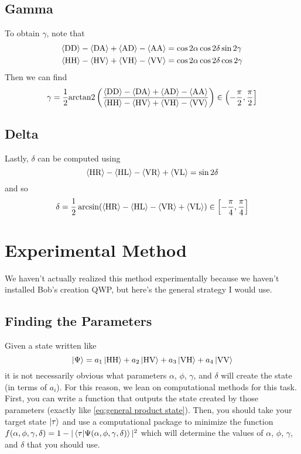 \documentclass{paper}[11pt]
\begin{document}
	
	\subsection{Gamma}
	To obtain $\gamma$, note that
	\begin{align}
		{\langle{\text{DD}}\rangle}-{\langle{\text{DA}}\rangle}+{\langle{\text{AD}}\rangle}-{\langle{\text{AA}}\rangle} &= \cos2\alpha\cos2\delta\sin2\gamma \\
		{\langle{\text{HH}}\rangle}-{\langle{\text{HV}}\rangle}+{\langle{\text{VH}}\rangle}-{\langle{\text{VV}}\rangle} &= \cos2\alpha\cos2\delta\cos2\gamma
	\end{align}
	Then we can find
	\begin{equation}
		\gamma=\frac{1}{2}\text{\rmfamily arctan2\normalfont}\left(\frac{{\langle{\text{DD}}\rangle}-{\langle{\text{DA}}\rangle}+{\langle{\text{AD}}\rangle}-{\langle{\text{AA}}\rangle}}{{\langle{\text{HH}}\rangle}-{\langle{\text{HV}}\rangle}+{\langle{\text{VH}}\rangle}-{\langle{\text{VV}}\rangle}}\right)\in\left(-\frac{\pi}{2}, \frac{\pi}{2}\right]\label{eq:experimental gamma}
	\end{equation}
	
	\subsection{Delta}
	Lastly, $\delta$ can be computed using
	\begin{equation}
		{\langle{\text{HR}}\rangle}-{\langle{\text{HL}}\rangle}-{\langle{\text{VR}}\rangle}+{\langle{\text{VL}}\rangle} = \sin2\delta
	\end{equation}
	and so
	\begin{equation}
		\delta = \frac{1}{2}\arcsin({\langle{\text{HR}}\rangle}-{\langle{\text{HL}}\rangle}-{\langle{\text{VR}}\rangle}+{\langle{\text{VL}}\rangle})\in\left[-\frac{\pi}{4}, \frac{\pi}{4}\right]\label{eq:experimental delta}
	\end{equation}
	
	\section{Experimental Method}
	We haven't actually realized this method experimentally because we haven't installed Bob's creation QWP, but here's the general strategy I would use.
	
	\subsection{Finding the Parameters}
	Given a state written like
	\begin{equation}
		\ket{\Psi} = a_1\ket{\text{HH}} + a_2\ket{\text{HV}} + a_3\ket{\text{VH}} + a_4\ket{\text{VV}}
	\end{equation}
	it is not necessarily obvious what parameters $\alpha$, $\phi$, $\gamma$, and $\delta$ will create the state (in terms of $a_i$). For this reason, we lean on computational methods for this task. First, you can write a function that outputs the state created by those parameters (exactly like \cref{eq:general product state}). Then, you should take your target state $\ket{\tau}$ and use a computational package to minimize the function $f(\alpha,\phi,\gamma,\delta)=1-|\bra{\tau}\ket{\Psi(\alpha,\phi,\gamma,\delta)}|^2$ which will determine the values of $\alpha$, $\phi$, $\gamma$, and $\delta$ that you should use.
	
\end{document}
